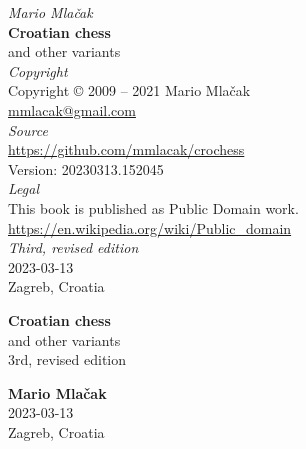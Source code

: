 \documentclass[a5paper,12pt]{book} %
\begin{document}
\thispagestyle{empty}
\vspace*{0.05\textheight}
\begin{center}
    \emph{Mario Mlačak} \\
    \textbf{Croatian chess} \\
    and other variants \\ [2.0em]

    \emph{Copyright} \\
    Copyright \copyright \hspace{0.2ex} 2009 -- 2021 Mario Mlačak \\
    \href{mailto:mmlacak@gmail.com}{mmlacak@gmail.com} \\ [2.0em]

    \emph{Source} \\
    \href{https://github.com/mmlacak/crochess}{https://github.com/mmlacak/crochess} \\
    Version: 20230313.152045 \\ [2.0em] %

    \emph{Legal} \\
    This book is published as Public Domain work. \\
    \href{https://en.wikipedia.org/wiki/Public\_domain}{https://en.wikipedia.org/wiki/Public\_domain} \\ [2.0em]

    \emph{Third, revised edition} \\
    2023-03-13 \\ %
    Zagreb, Croatia

    \vfill
    \LaTeXe
    \vspace{0.05\textheight}
\end{center}
\clearpage %

\thispagestyle{empty}
\vspace*{0.2\textheight}
\begin{center}
    \textbf{\Large{Croatian chess}} \\ [1.0em]
    \large{and other variants} \\ [1.0em]
    \small{3rd, revised edition} \\ [2.0cm]
    \vspace*{0.2\textheight}

    \textbf{\large{Mario Mlačak}} \\ [1.0em]
    \small{2023-03-13} \\ [0.5em] %
    \small{Zagreb, Croatia}
\end{center}
\clearpage %
\end{document}
